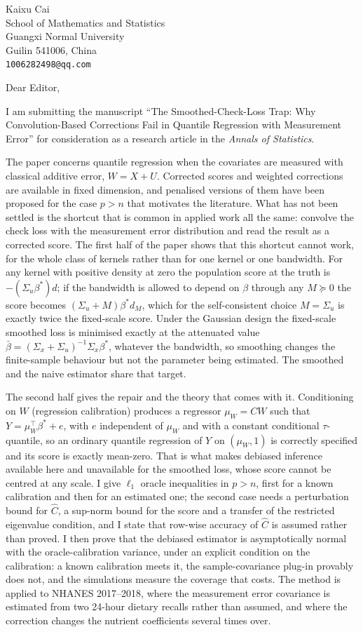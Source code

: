 \documentclass[11pt]{article}
\begin{document}
Kaixu Cai\\
School of Mathematics and Statistics\\
Guangxi Normal University\\
Guilin 541006, China\\
\texttt{1006282498@qq.com}

\bigskip
Dear Editor,

I am submitting the manuscript ``The Smoothed-Check-Loss Trap: Why Convolution-Based
Corrections Fail in Quantile Regression with Measurement Error'' for consideration as a
research article in the \emph{Annals of Statistics}.

The paper concerns quantile regression when the covariates are measured with classical
additive error, $W=X+U$. Corrected scores and weighted corrections are available in fixed
dimension, and penalised versions of them have been proposed for the case $p>n$ that motivates
the literature. What has not been settled is the shortcut that is common in applied work all
the same: convolve the check loss with the measurement error distribution and read the result
as a corrected score. The first half of the paper shows that this shortcut cannot work, for the
whole class of kernels rather than for one kernel or one bandwidth. For any kernel with
positive density at zero the population score at the truth is $-(\Sigma_u\beta^*)d$; if the
bandwidth is allowed to depend on $\beta$ through any $M\succeq0$ the score becomes
$(\Sigma_u+M)\beta^*d_M$, which for the self-consistent choice $M=\Sigma_u$ is exactly twice
the fixed-scale score. Under the Gaussian design the fixed-scale smoothed loss is minimised
exactly at the attenuated value $\bar\beta=(\Sigma_x+\Sigma_u)^{-1}\Sigma_x\beta^*$, whatever
the bandwidth, so smoothing changes the finite-sample behaviour but not the parameter being
estimated. The smoothed and the naive estimator share that target.

The second half gives the repair and the theory that comes with it. Conditioning on $W$
(regression calibration) produces a regressor $\mu_W=CW$ such that
$Y=\mu_W^\top\beta^*+e$, with $e$ independent of $\mu_W$ and with a constant conditional
$\tau$-quantile, so an ordinary quantile regression of $Y$ on $(\mu_W,1)$ is correctly
specified and its score is exactly mean-zero. That is what makes debiased inference available
here and unavailable for the smoothed loss, whose score cannot be centred at any scale. I give
$\ell_1$ oracle inequalities in $p>n$, first for a known calibration and then for an estimated
one; the second case needs a perturbation bound for $\hat C$, a sup-norm bound for the score
and a transfer of the restricted eigenvalue condition, and I state that row-wise accuracy of
$\hat C$ is assumed rather than proved. I then prove that the debiased estimator is
asymptotically normal with the oracle-calibration variance, under an explicit condition on the
calibration: a known calibration meets it, the sample-covariance plug-in provably does not, and
the simulations measure the coverage that costs. The method is applied to NHANES 2017--2018,
where the measurement error covariance is estimated from two 24-hour dietary recalls rather
than assumed, and where the correction changes the nutrient coefficients several times over.
\end{document}
